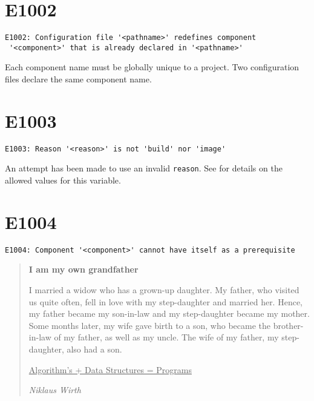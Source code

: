 \section{E1002}

\begin{footnotesize}
\begin{verbatim}
E1002: Configuration file '<pathname>' redefines component
 '<component>' that is already declared in '<pathname>'
\end{verbatim}
\end{footnotesize}

Each component name must be globally unique to a project.  Two
configuration files declare the same component name.

\section{E1003}

\begin{footnotesize}
\begin{verbatim}
E1003: Reason '<reason>' is not 'build' nor 'image'
\end{verbatim}
\end{footnotesize}

An attempt has been made to use an invalid \texttt{reason}.  See
 for details on the allowed values for this
variable.

\section{E1004}

\begin{footnotesize}
\begin{verbatim}
E1004: Component '<component>' cannot have itself as a prerequisite
\end{verbatim}
\end{footnotesize}

\begin{quote}
  \textbf{I am my own grandfather}

  I married a widow who has a grown-up daughter.  My father, who
  visited us quite often, fell in love with my step-daughter and
  married her.  Hence, my father became my son-in-law and my
  step-daughter became my mother.  Some months later, my wife gave
  birth to a son, who became the brother-in-law of my father, as well
  as my uncle. The wife of my father, my step-daughter, also had a
  son.

  \underline{Algorithm's + Data Structures = Programs}

  \emph{Niklaus Wirth}
\end{quote}

